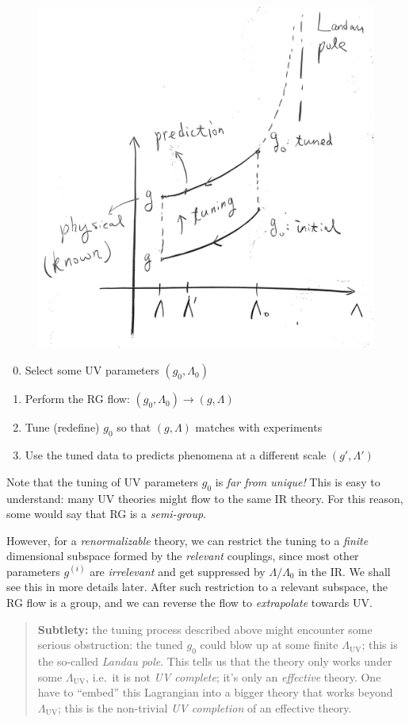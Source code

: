 \documentclass[a4paper
	,10pt
]{article}
\begin{document}
	\begin{figure}[!h]
	\centering
	\includegraphics[width=.5\linewidth]{img/RG-process.png}
	\end{figure}
	
	\begin{enumerate}[noitemsep,midpenalty=100]
	\setcounter{enumi}{-1}
	
	\item
	  Select some UV parameters $(g_0,\Lambda_0)$
	\item
	  Perform the RG flow: $(g_0,\Lambda_0)\to (g,\Lambda)$
	\item
	  Tune (redefine) $g_0$ so that $(g,\Lambda)$ matches with
	  experiments
	\item
	  Use the tuned data to predicts phenomena at a different scale
	  $(g',\Lambda')$
	\end{enumerate}
	
	Note that the tuning of UV parameters $g_0$ is \emph{far from unique!}
	This is easy to understand: many UV theories might flow to the same IR
	theory. For this reason, some would say that RG is a \emph{semi-group}.
	
	However, for a \emph{renormalizable} theory, we can restrict the tuning
	to a \emph{finite} dimensional subspace formed by the \emph{relevant}
	couplings, since most other parameters $g^{(i)}$ are \emph{irrelevant}
	and get suppressed by $\Lambda/\Lambda_0$ in the IR. We shall see this in more details later. After such
	restriction to a relevant subspace, the RG flow is a group, and we can
	reverse the flow to \emph{extrapolate} towards UV.
	
	\begin{quote}
	\textbf{Subtlety:} the tuning process described above might encounter some serious
	obstruction: the tuned $g_0$ could blow up at some finite
	$\Lambda_{\mathrm{UV}}$; this is the so-called \emph{Landau pole}.
	This tells us that the theory only works under some
	$\Lambda_{\mathrm{UV}}$, i.e.~it is not \emph{UV complete}; it's only
	an \emph{effective} theory. One have to ``embed'' this Lagrangian into a
	bigger theory that works beyond $\Lambda_{\mathrm{UV}}$; this is the
	non-trivial \emph{UV completion} of an effective theory.
	\end{quote}
\end{document}
